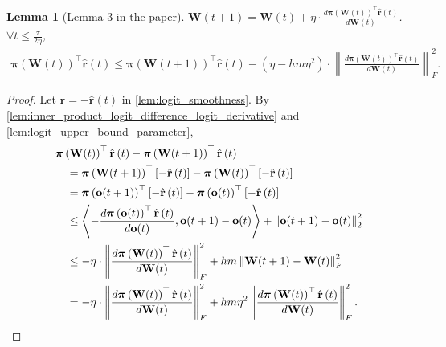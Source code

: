 \documentclass[10pt]{article}
\def\rvo{{\mathbf{o}}}
\def\rvr{{\mathbf{r}}}
\def\rvo{{\mathbf{o}}}
\newtheorem{lem}{Lemma}
\def\rvpi{{\boldsymbol{\pi}}}
\def\rmW{{\mathbf{W}}}
\begin{document}
\begin{lem}[Lemma 3 in the paper]
\label{lem:empirically_expected_reward_parameter_smoothness}
    $\rmW(t+1) = \rmW(t) + \eta \cdot \frac{d \rvpi\left(\rmW(t)\right)^\top \hat{\rvr}\left(t\right)}{d \rmW(t)}$. $\forall t \le \frac{\tau}{ 2 \eta }$,
\begin{equation*}
\label{eq:parameter_smoothness}
\begin{split}
    \rvpi\left( \rmW(t) \right)^\top \hat{\rvr}\left(t\right) \le \rvpi\left( \rmW(t+1) \right)^\top \hat{\rvr}\left(t\right) - \left( \eta - h m \eta^2 \right) \cdot \left\| \frac{d \rvpi\left( \rmW(t) \right)^\top \hat{\rvr}\left(t\right)}{d \rmW(t)} \right\|_F^2.
\end{split}
\end{equation*}
\end{lem}
\begin{proof}
   Let $\rvr = - \hat{\rvr}\left(t\right)$ in \cref{lem:logit_smoothness}. By \cref{lem:inner_product_logit_difference_logit_derivative} and \cref{lem:logit_upper_bound_parameter},
\begin{equation*}
\begin{split}
    &\rvpi\left( \rmW(t) \right)^\top \hat{\rvr}\left(t\right) - \rvpi\left( \rmW(t+1) \right)^\top \hat{\rvr}\left(t\right) \\
    &\quad = \rvpi\left( \rmW(t+1) \right)^\top \left[ - \hat{\rvr}\left(t\right) \right] - \rvpi\left( \rmW(t) \right)^\top \left[ - \hat{\rvr}\left(t\right) \right]  \\
    &\quad = \rvpi\left( \rvo(t+1) \right)^\top \left[ - \hat{\rvr}\left(t\right) \right] - \rvpi\left( \rvo(t) \right)^\top \left[ - \hat{\rvr}\left(t\right) \right] \\
    &\quad \le \left\langle - \frac{d \rvpi\left( \rvo(t) \right)^\top \hat{\rvr}\left(t\right)}{d \rvo(t)}, \rvo(t+1) - \rvo(t) \right\rangle + \left\| \rvo(t+1) - \rvo(t)  \right\|_2^2 \\
    &\quad \le - \eta \cdot \left\| \frac{d \rvpi\left(\rmW(t)\right)^\top \hat{\rvr}\left(t\right)}{d \rmW(t)} \right\|_F^2 + h m \left\| \rmW(t+1) - \rmW(t) \right\|_F^2 \\
    &\quad = - \eta \cdot \left\| \frac{d \rvpi\left(\rmW(t)\right)^\top \hat{\rvr}\left(t\right)}{d \rmW(t)} \right\|_F^2 + h m \eta^2 \left\| \frac{d \rvpi\left(\rmW(t)\right)^\top \hat{\rvr}\left(t\right)}{d \rmW(t)} \right\|_F^2. \qedhere
\end{split}
\end{equation*}
\end{proof}
\end{document}
